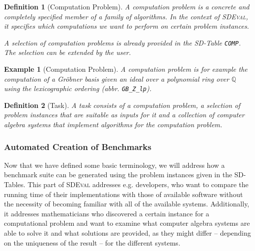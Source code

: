 \documentclass[oribibl,11pt]{article}
\newtheorem{example}{Example}
\newtheorem{definition}{Definition}
\begin{document}
\vspace*{-10pt}
\begin{definition}[Computation Problem]
  \label{def:ComputationProblem}
   A computation problem is a concrete and
  completely specified member of a family of algorithms.  In the
  context of \textsc{SDEval}, it specifies which computations we want
  to perform on certain problem instances.

  A selection of computation problems is already provided in the
  SD-Table \texttt{COMP}. The selection can be extended by the user.
\end{definition}
\vspace*{-10pt}
\begin{example}[Computation Problem]
 A computation problem is for example the computation of a Gr\"obner
 basis given an ideal over a polynomial ring over $\mathbb{Q}$ using
 the lexicographic ordering (abbr. \texttt{GB\_Z\_lp}).
\end{example}
\vspace*{-10pt}
\begin{definition}[Task]
  \label{def:Task}
   A task consists of a computation problem, a
  selection of problem instances that are suitable as inputs for it
  and a collection of computer algebra systems that implement
  algorithms for the computation problem.
\end{definition}
\vspace*{-10pt}
\subsubsection{Automated Creation of Benchmarks}

Now that we have defined some basic terminology, we will address how a
benchmark suite can be generated using the problem instances given in
the SD-Tables. This part of \textsc{SDEval} addresses e.g. developers, who want to compare the running time
of their implementations with those of available software without the
necessity of becoming familiar with all of the available systems.
Additionally, it addresses mathematicians who discovered a
certain instance for a computational problem and want to examine what
computer algebra systems are able to solve it and what solutions are
provided, as they might differ -- depending on the uniqueness of the
result -- for the different systems.
\end{document}
